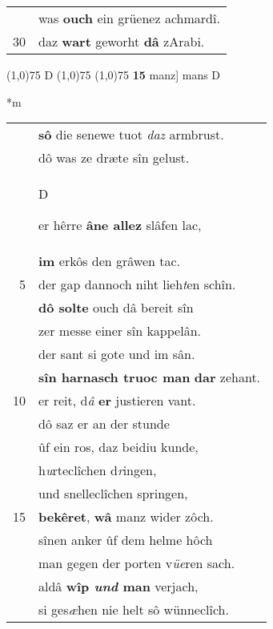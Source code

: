 \documentclass[8pt,a4paper,notitlepage]{article}
\begin{document}
\begin{table}[ht]
\begin{minipage}[t]{0.5\linewidth}
\begin{tabular}{rl}
 & was \textbf{ouch} ein grüenez achmardî.\\ 
30 & daz \textbf{wart} geworht \textbf{dâ} zArabi.\\ 
\end{tabular}
\scriptsize
\line(1,0){75} \newline
D \newline
\line(1,0){75} \newline
\newline
\line(1,0){75} \newline
\textbf{15} manz] mans D \newline
\end{minipage}
\hspace{0.5cm}
\begin{minipage}[t]{0.5\linewidth}
\small
\begin{center}*m
\end{center}
\begin{tabular}{rl}
 & \textbf{sô} die senewe tuot \textit{daz} armbrust.\\ 
 & dô was ze dræte sîn gelust.\\ 
 & \begin{large}D\end{large}er hêrre \textbf{âne allez} slâfen lac,\\ 
 & \textbf{im} erkôs den grâwen tac.\\ 
5 & der gap dannoch niht lieh\textit{t}en schîn.\\ 
 & \textbf{dô solte} ouch dâ bereit sîn\\ 
 & zer messe einer sîn kappelân.\\ 
 & der sant si gote und im sân.\\ 
 & \textbf{sîn harnasch truoc man} \textbf{dar} zehant.\\ 
10 & er reit, d\textit{â} \textbf{er} justieren vant.\\ 
 & dô saz er an der stunde\\ 
 & ûf ein ros, daz beidiu kunde,\\ 
 & h\textit{u}rteclîchen d\textit{r}ingen,\\ 
 & und snelleclîchen springen,\\ 
15 & \textbf{bekêret}, \textbf{wâ} manz wider zôch.\\ 
 & sînen anker ûf dem helme hôch\\ 
 & man gegen der porten v\textit{üe}ren sach.\\ 
 & aldâ \textbf{wîp \textit{und} man} verjach,\\ 
 & si ges\textit{æ}hen nie helt sô wünneclîch.\\ 

\end{tabular}
\end{minipage}
\end{table}
\end{document}
